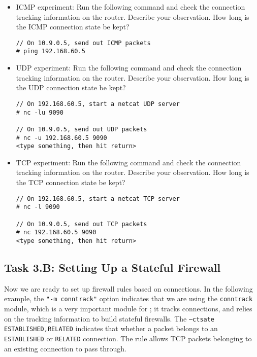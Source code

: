 \begin{itemize}
\item ICMP experiment: Run the following command and 
check the connection tracking information on the router. Describe
your observation. How long is the ICMP connection state be kept? 

\begin{lstlisting}
// On 10.9.0.5, send out ICMP packets
# ping 192.168.60.5
\end{lstlisting}

\item UDP experiment: Run the following command and 
check the connection tracking information on the router. Describe
your observation. How long is the UDP connection state be kept? 


\begin{lstlisting}
// On 192.168.60.5, start a netcat UDP server
# nc -lu 9090

// On 10.9.0.5, send out UDP packets  
# nc -u 192.168.60.5 9090
<type something, then hit return>
\end{lstlisting}


\item TCP experiment: Run the following command and 
check the connection tracking information on the router. Describe
your observation. How long is the TCP connection state be kept? 

\begin{lstlisting}
// On 192.168.60.5, start a netcat TCP server
# nc -l 9090

// On 10.9.0.5, send out TCP packets 
# nc 192.168.60.5 9090
<type something, then hit return>
\end{lstlisting}

\end{itemize}
 


\subsection{Task 3.B: Setting Up a Stateful Firewall} 


Now we are ready to set up firewall rules based on connections. 
In the following example, 
the \texttt{"-m conntrack"} option indicates that we are using the \texttt{conntrack} module,
which is a very important module for \iptables; it tracks connections, and
\iptables relies on the tracking information to build stateful firewalls. 
The \texttt{--ctsate ESTABLISHED,RELATED} indicates that whether a packet
belongs to an \texttt{ESTABLISHED} or \texttt{RELATED} connection.
The rule allows TCP packets belonging to an existing connection to 
pass through. 

